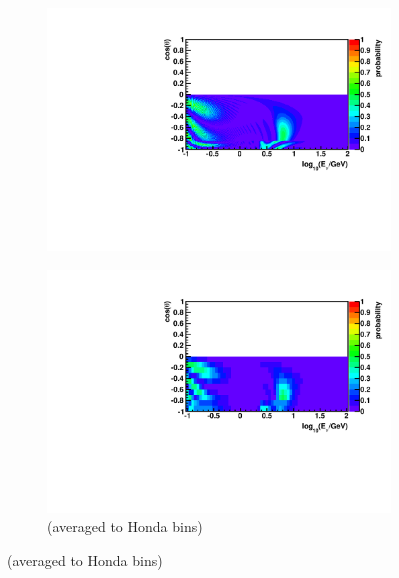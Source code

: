 \documentclass{beamer}
\begin{document}
\begin{frame}
\begin{figure}
		\begin{subfigure}[]{0.45\linewidth}
			\centering
			\vspace{-15pt}
			\caption{ $\nu_{e} \rightarrow \nu_{\mu}$ }
			\vspace{-8pt}
			\includegraphics[width=\linewidth]{atm_nue2numu.pdf} \\
			\vspace{-10pt}
			\caption*{(averaged to Honda bins)}
			\vspace{-8pt}
			\includegraphics[width=\linewidth]{atm_nue2numu_avg.pdf}
			\vspace{-13pt}
		\end{subfigure}
	\end{figure}
\end{frame}
\end{document}
